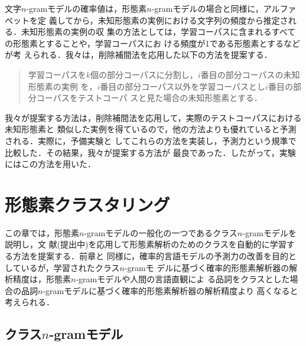 文字$n$-gramモデルの確率値は，形態素$n$-gramモデルの場合と同様に，アルファベットを定
義してから，未知形態素の実例における文字列の頻度から推定される．未知形態素の実例の収
集の方法としては，学習コーパスに含まれるすべての形態素とすることや，学習コーパスにお
ける頻度が1である形態素とする\cite{単語頻度の期待値に基づく未知語の自動収集}などが考
えられる．我々は，削除補間法を応用した以下の方法を提案する．
\begin{quote}
  学習コーパスを$k$個の部分コーパスに分割し，$i$番目の部分コーパスの未知形態素の実例
  を，$i$番目の部分コーパス以外を学習コーパスとし$i$番目の部分コーパスをテストコーパ
  スと見た場合の未知形態素とする．
\end{quote}
我々が提案する方法は，削除補間法を応用して，実際のテストコーパスにおける未知形態素と
類似した実例を得ているので，他の方法よりも優れていると予測される．実際に，予備実験と
してこれらの方法を実装し，予測力という規準で比較した．その結果，我々が提案する方法が
最良であった．したがって，実験にはこの方法を用いた．







\section{形態素クラスタリング}

この章では，形態素$n$-gramモデルの一般化の一つであるクラス$n$-gramモデルを説明し，文
献(提出中)を応用して形態素解析のためのクラスを自動的に学習する方法を提案する．前章と
同様に，確率的言語モデルの予測力の改善を目的としているが，学習されたクラス$n$-gramモ
デルに基づく確率的形態素解析器の解析精度は，形態素$n$-gramモデルや人間の言語直観によ
る品詞をクラスとした場合の品詞$n$-gramモデルに基づく確率的形態素解析器の解析精度より
高くなると考えられる．



\subsection{クラス$n$-gramモデル}

